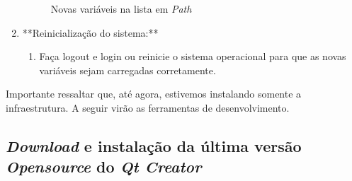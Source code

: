 \documentclass[a4paper,11pt]{article}
\newcommand{\qtcreator}{\textit{Qt Creator}}
\begin{document}
\begin{enumerate}
	\begin{figure}[H]\centering
		\caption{Novas variáveis na lista em \emph{Path}}\label{fig:qtpathenv}
	\end{figure}
	
	\item **Reinicialização do sistema:**
	\begin{enumerate}
		\item Faça logout e login ou reinicie o sistema operacional para que as novas variáveis sejam carregadas corretamente.
	\end{enumerate}
\end{enumerate}

Importante ressaltar que, até agora, estivemos instalando somente a infraestrutura.  A seguir virão as ferramentas de desenvolvimento.


\subsection{\textit{Download} e instalação da última versão \textit{Opensource} do \qtcreator{}}
\end{document}
